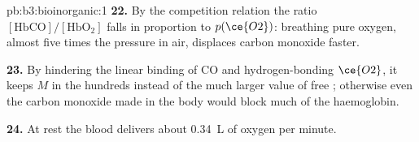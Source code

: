 \begin{solution}{pb:b3:bioinorganic:1}
\textbf{22.} By the competition relation the ratio $[\mathrm{HbCO}]/[\mathrm{HbO_2}]$ falls in proportion to $p(\ce{O2})$:
breathing pure oxygen, almost five times the pressure in air, displaces carbon
monoxide faster.

\textbf{23.} By hindering the linear binding of CO and hydrogen-bonding $\ce{O2}$, it keeps $M$ in
the hundreds instead of the much larger value of free ; otherwise even the
carbon monoxide made in the body would block much of the haemoglobin.

\textbf{24.} At rest the blood delivers about \qty{0.34}{L} of oxygen per minute.
\end{solution}
